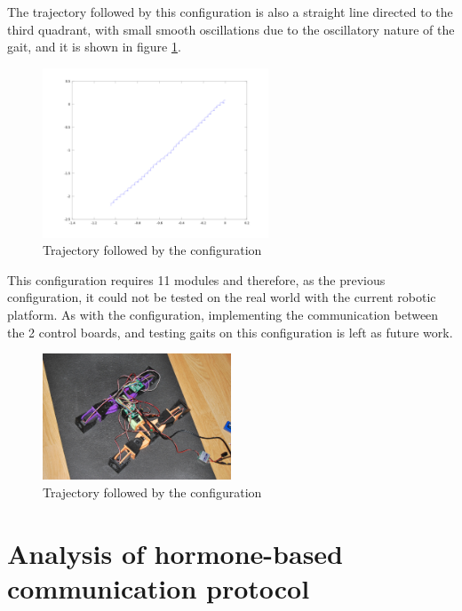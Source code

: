 The trajectory followed by this configuration is also a straight line directed to the third quadrant, with small smooth oscillations due to the oscillatory nature of the gait, and it is shown in figure \ref{fig:robot_11_trajectory}.\\

\begin{figure}[h]
		\centering
        \includegraphics[width=0.6\textwidth]{images/results_11_trajectory.png}
        \caption{Trajectory followed by the \robotEleven configuration}
        \label{fig:robot_11_trajectory}
\end{figure} 

This configuration requires 11 modules and therefore, as the previous configuration, it could not be tested on the real world with the current robotic platform. As with the \robotNine configuration, implementing the communication between the 2 control boards, and testing gaits on this configuration is left as future work.\\

\begin{figure}[H]
		\centering
        \includegraphics[width=0.5\textwidth]{images/results_11_real_robot.jpg}
        \caption{Trajectory followed by the \robotNine configuration}
        \label{fig:robot_11_real}
\end{figure} 


\newpage
\section{Analysis of hormone-based communication protocol}
\label{results_hormones}

